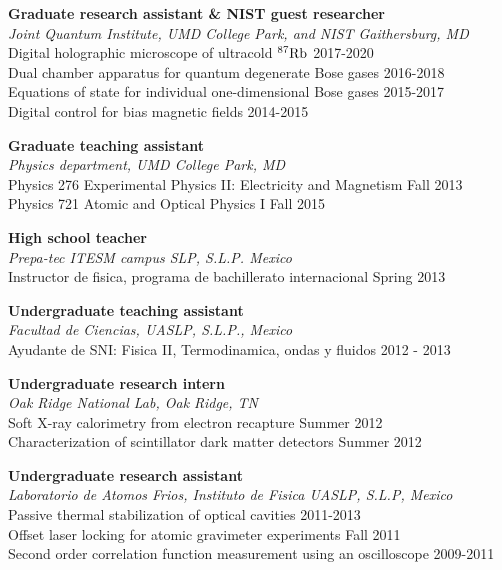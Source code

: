 \documentclass[margin]{res} %
\begin{document}
\begin{resume}
{\bf Graduate research assistant \& NIST guest researcher} \\
{\it Joint Quantum Institute, UMD College Park, and NIST Gaithersburg, MD}\\
{Digital holographic microscope of ultracold ${^{87} {\rm Rb}}$} \hfill 2017-2020 \\
{Dual chamber apparatus for quantum degenerate Bose gases} \hfill 2016-2018\\
{Equations of state for individual one-dimensional Bose gases} \hfill 2015-2017\\
{Digital control for bias magnetic fields} \hfill 2014-2015

{\bf Graduate teaching assistant} \\
{\it Physics department, UMD College Park, MD}\\
{Physics 276 Experimental Physics II: Electricity and Magnetism} \hfill Fall 2013\\
{Physics 721 Atomic and Optical Physics I} \hfill Fall 2015

{\bf High school teacher} \\
{\it Prepa-tec ITESM campus SLP, S.L.P. Mexico}\\ 
{Instructor de fisica, programa de bachillerato internacional} \hfill Spring 2013

{\bf Undergraduate teaching assistant} \\
{\it Facultad de Ciencias, UASLP, S.L.P., Mexico}\\
{Ayudante de SNI: Fisica II, Termodinamica, ondas y fluidos} \hfill 2012 - 2013

{\bf Undergraduate research intern} \\
{\it Oak Ridge National Lab, Oak Ridge, TN}\\
{Soft X-ray calorimetry from electron recapture} \hfill Summer 2012\\
{Characterization of scintillator dark matter detectors} \hfill Summer 2012

{\bf Undergraduate research assistant} \\
{\it Laboratorio de Atomos Frios, Instituto de Fisica UASLP, S.L.P, Mexico}\\
{Passive thermal stabilization of optical cavities} \hfill 2011-2013\\
{Offset laser locking for atomic gravimeter experiments} \hfill Fall 2011 \\
{Second order correlation function measurement using an oscilloscope} \hfill 2009-2011


\end{resume}
\end{document}
